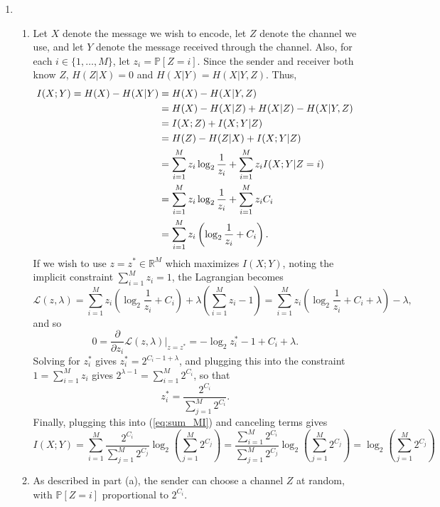 \documentclass[11pt]{article}
\newcommand{\pr}{\mathbb{P}} %
\newcommand{\R}{\mathbb{R}} %
\begin{document}
\begin{enumerate}
\begin{enumerate}
\end{enumerate}

\newpage
\item
\begin{enumerate}
\item Let $X$ denote the message we wish to encode, let $Z$ denote the channel
we use, and let $Y$ denote the message received through the channel. Also, for
each $i \in \{1,\dots,M\}$, let $z_i = \pr[Z = i]$. Since the sender and
receiver both know $Z$, $H(Z|X) = 0$ and $H(X|Y) = H(X|Y,Z)$. Thus,
\begin{align}
I(X;Y)
\notag
    = H(X) - H(X | Y)
 &  = H(X) - H(X|Y,Z)   \\
\notag
 &  = H(X) - H(X|Z) + H(X|Z) - H(X|Y,Z) \\
\notag
 &  = I(X;Z) + I(X;Y|Z) \\
\notag
 &  = H(Z) - H(Z|X) + I(X;Y|Z)  \\
\notag
 &  = \sum_{i = 1}^M z_i \log_2 \frac{1}{z_i} + \sum_{i = 1}^M z_i I(X;Y|Z = i)\\
\notag
 &  = \sum_{i = 1}^M z_i \log_2 \frac{1}{z_i} + \sum_{i = 1}^M z_i C_i \\
\label{eq:sum_MI}
 &  = \sum_{i = 1}^M z_i \left( \log_2 \frac{1}{z_i} + C_i \right).
\end{align}
If we wish to use $z = z^* \in \R^M$ which maximizes $I(X;Y)$, noting the
implicit constraint $\sum_{i = 1}^M z_i = 1$, the Lagrangian becomes
\[\mathcal{L}(z,\lambda)
    = \sum_{i = 1}^M z_i \left( \log_2 \frac{1}{z_i} + C_i \right)
        + \lambda \left( \sum_{i = 1}^M z_i - 1 \right)
    = \sum_{i = 1}^M z_i \left( \log_2 \frac{1}{z_i} + C_i + \lambda \right)
                                                                    - \lambda,
\]
and so
\[0
    = \frac{\partial}{\partial z_i} \mathcal{L}(z,\lambda) \bigg|_{z = z^*}
    = - \log_2 z_i^* - 1 + C_i + \lambda.
\]
Solving for $z_i^*$ gives $z_i^* = 2^{C_i - 1 + \lambda}$, and plugging this
into the constraint $1 = \sum_{i = 1}^M z_i$ gives
$2^{\lambda - 1} = \sum_{i = 1}^M 2^{C_i}$, so that
\[z_i^* = \frac{2^{C_i}}{\sum_{j = 1}^M 2^{C_i}}.\]
Finally, plugging this into (\ref{eq:sum_MI}) and canceling terms gives
\[I(X;Y)
    = \sum_{i = 1}^M \frac{2^{C_i}}{\sum_{j = 1}^M 2^{C_j}}
      \log_2\left( \sum_{j = 1}^M 2^{C_j} \right)
    = \frac{\sum_{i = 1}^M 2^{C_i}}{\sum_{j = 1}^M 2^{C_j}}
      \log_2\left( \sum_{j = 1}^M 2^{C_j} \right)
    = \log_2\left( \sum_{j = 1}^M 2^{C_j} \right)
\]

\item As described in part (a), the sender can choose a channel $Z$ at
random, with $\pr[Z = i]$ proportional to $2^{C_i}$.


\end{enumerate}
\end{enumerate}
\end{document}
